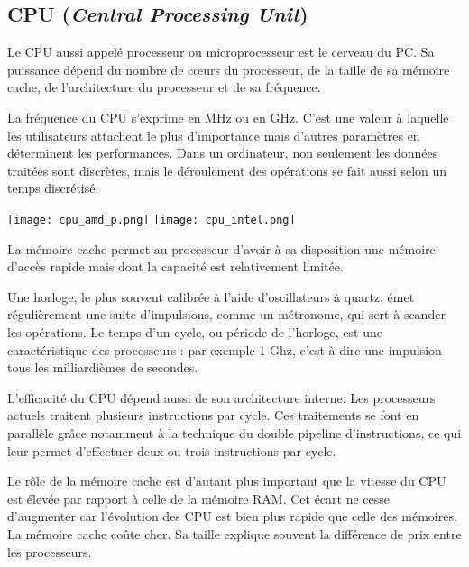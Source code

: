 \subsection{CPU (\textit{Central Processing Unit})}


\noindent\begin{minipage}[c]{.65\linewidth}
Le CPU aussi appelé processeur ou microprocesseur est le cerveau du PC. Sa puissance dépend du nombre de cœurs du processeur, de la taille de sa mémoire cache, de l'architecture du processeur et de sa fréquence.

La fréquence du CPU s'exprime en MHz ou en GHz. C'est une valeur à laquelle les utilisateurs
attachent le plus d'importance mais d'autres paramètres en déterminent les performances.
Dans un ordinateur, non seulement les données traitées sont discrètes, mais le déroulement
des opérations se fait aussi selon un temps discrétisé.
\end{minipage}\hfill
\begin{minipage}[c]{.3\linewidth}
\begin{center}
\texttt{[image: cpu\_amd\_p.png]}
\texttt{[image: cpu\_intel.png]}
\end{center}
\end{minipage}

\vspace{.25cm}

La mémoire cache permet au processeur d'avoir à sa disposition une mémoire d'accès rapide mais dont la capacité est relativement limitée. 


Une horloge, le plus souvent calibrée à l'aide d'oscillateurs à quartz, émet régulièrement une suite d'impulsions, comme un métronome, qui sert à scander les opérations. Le temps d'un
cycle, ou période de l'horloge, est une caractéristique des processeurs : par exemple 1 Ghz,
c'est-à-dire une impulsion tous les milliardièmes de secondes.

L'efficacité du CPU dépend aussi de son architecture interne. Les processeurs actuels
traitent plusieurs instructions par cycle. Ces traitements se font en parallèle grâce
notamment à la technique du double pipeline d'instructions, ce qui leur permet d'effectuer
deux ou trois instructions par cycle.

Le rôle de la mémoire cache est d'autant plus important que la vitesse du CPU est élevée par
rapport à celle de la mémoire RAM. Cet écart ne cesse d'augmenter car l'évolution des CPU est bien plus rapide que celle des
mémoires. La mémoire cache coûte cher. Sa taille explique souvent la différence de prix
entre les processeurs.

